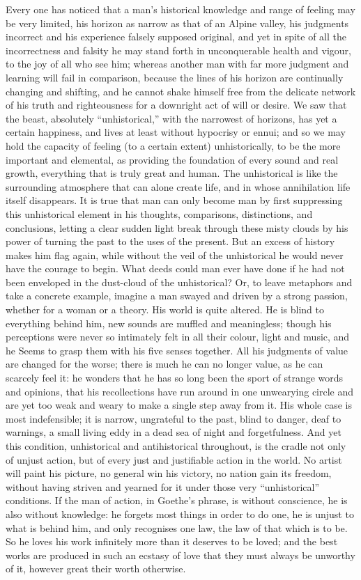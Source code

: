Every one has noticed that a man's historical knowledge and range of
feeling may be very limited, his horizon as narrow as that of an
Alpine valley, his judgments incorrect and his experience falsely
supposed original, and yet in spite of all the incorrectness and
falsity he may stand forth in unconquerable health and vigour, to the
joy of all who see him; whereas another man with far more judgment
and learning will fail in comparison, because the lines of his
horizon are continually changing and shifting, and he cannot shake
himself free from the delicate network of his truth and righteousness
for a downright act of will or desire. We saw that the beast,
absolutely \enquote{unhistorical,} with the narrowest of horizons, has yet a
certain happiness, and lives at least without hypocrisy or ennui; and
so we may hold the capacity of feeling (to a certain extent)
unhistorically, to be the more important and elemental, as providing
the foundation of every sound and real growth, everything that is
truly great and human. The unhistorical is like the surrounding
atmosphere that can alone create life, and in whose annihilation life
itself disappears. It is true that man can only become man by first
suppressing this unhistorical element in his thoughts, comparisons,
distinctions, and conclusions, letting a clear sudden light break
through these misty clouds by his power of turning the past to the
uses of the present. But an excess of history makes him flag again,
while without the veil of the unhistorical he would never have the
courage to begin. What deeds could man ever have done if he had not
been enveloped in the dust-cloud of the unhistorical? Or, to leave
metaphors and take a concrete example, imagine a man swayed and
driven by a strong passion, whether for a woman or a theory. His
world is quite altered. He is blind to everything behind him, new
sounds are muffled and meaningless; though his perceptions were never
so intimately felt in all their colour, light and music, and he Seems
to grasp them with his five senses together. All his judgments of
value are changed for the worse; there is much he can no longer
value, as he can scarcely feel it: he wonders that he has so long
been the sport of strange words and opinions, that his recollections
have run around in one unwearying circle and are yet too weak and
weary to make a single step away from it. His whole case is most
indefensible; it is narrow, ungrateful to the past, blind to danger,
deaf to warnings, a small living eddy in a dead sea of night and
forgetfulness. And yet this condition, unhistorical and
antihistorical throughout, is the cradle not only of unjust action,
but of every just and justifiable action in the world. No artist will
paint his picture, no general win his victory, no nation gain its
freedom, without having striven and yearned for it under those very
\enquote{unhistorical} conditions. If the man of action, in Goethe's phrase,
is without conscience, he is also without knowledge: he forgets most
things in order to do one, he is unjust to what is behind him, and
only recognises one law, the law of that which is to be. So he loves
his work infinitely more than it deserves to be loved; and the best
works are produced in such an ecstasy of love that they must always
be unworthy of it, however great their worth otherwise.

